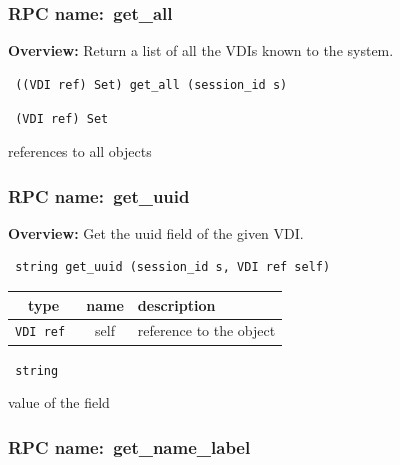 \subsubsection{RPC name:~get\_all}

{\bf Overview:} 
Return a list of all the VDIs known to the system.

\begin{verbatim} ((VDI ref) Set) get_all (session_id s)\end{verbatim}


\vspace{0.3cm}

{\tt 
(VDI ref) Set
}


references to all objects
\vspace{0.3cm}
\vspace{0.3cm}
\vspace{0.3cm}
\subsubsection{RPC name:~get\_uuid}

{\bf Overview:} 
Get the uuid field of the given VDI.

\begin{verbatim} string get_uuid (session_id s, VDI ref self)\end{verbatim}



 
\vspace{0.3cm}
\begin{tabular}{|c|c|p{7cm}|}
 \hline
{\bf type} & {\bf name} & {\bf description} \\ \hline
{\tt VDI ref } & self & reference to the object \\ \hline 

\end{tabular}

\vspace{0.3cm}

{\tt 
string
}


value of the field
\vspace{0.3cm}
\vspace{0.3cm}
\vspace{0.3cm}
\subsubsection{RPC name:~get\_name\_label}

